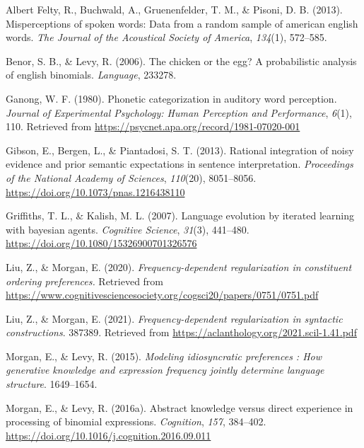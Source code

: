 \documentclass[
  jou,floatsintext]{apa6}
\newlength{\cslhangindent}
\newenvironment{CSLReferences}[2] %
 {\begin{list}{}{%
  \setlength{\itemindent}{0pt}
  \setlength{\leftmargin}{0pt}
  \setlength{\parsep}{0pt}
  \ifodd #1
   \setlength{\leftmargin}{\cslhangindent}
   \setlength{\itemindent}{-1\cslhangindent}
  \fi
  \setlength{\itemsep}{#2\baselineskip}}}
 {\end{list}}
\begin{document}
\label{refs}
\begin{CSLReferences}{1}{0}
Albert Felty, R., Buchwald, A., Gruenenfelder, T. M., \& Pisoni, D. B. (2013). Misperceptions of spoken words: Data from a random sample of american english words. \emph{The Journal of the Acoustical Society of America}, \emph{134}(1), 572--585.

Benor, S. B., \& Levy, R. (2006). The chicken or the egg? A probabilistic analysis of english binomials. \emph{Language}, 233278.

Ganong, W. F. (1980). Phonetic categorization in auditory word perception. \emph{Journal of Experimental Psychology: Human Perception and Performance}, \emph{6}(1), 110. Retrieved from \url{https://psycnet.apa.org/record/1981-07020-001}

Gibson, E., Bergen, L., \& Piantadosi, S. T. (2013). Rational integration of noisy evidence and prior semantic expectations in sentence interpretation. \emph{Proceedings of the National Academy of Sciences}, \emph{110}(20), 8051--8056. \url{https://doi.org/10.1073/pnas.1216438110}

Griffiths, T. L., \& Kalish, M. L. (2007). Language evolution by iterated learning with bayesian agents. \emph{Cognitive Science}, \emph{31}(3), 441--480. \url{https://doi.org/10.1080/15326900701326576}

Liu, Z., \& Morgan, E. (2020). \emph{Frequency-dependent regularization in constituent ordering preferences.} Retrieved from \url{https://www.cognitivesciencesociety.org/cogsci20/papers/0751/0751.pdf}

Liu, Z., \& Morgan, E. (2021). \emph{Frequency-dependent regularization in syntactic constructions}. 387389. Retrieved from \url{https://aclanthology.org/2021.scil-1.41.pdf}

Morgan, E., \& Levy, R. (2015). \emph{Modeling idiosyncratic preferences : How generative knowledge and expression frequency jointly determine language structure}. 1649--1654.

Morgan, E., \& Levy, R. (2016a). Abstract knowledge versus direct experience in processing of binomial expressions. \emph{Cognition}, \emph{157}, 384--402. \url{https://doi.org/10.1016/j.cognition.2016.09.011}


\end{CSLReferences}
\end{document}
